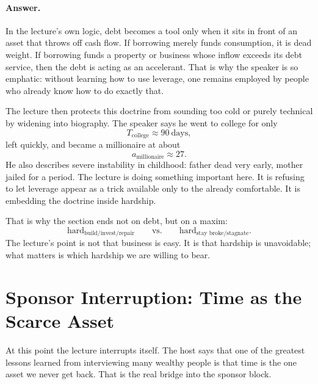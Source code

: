 \paragraph{Answer.} In the lecture's own logic, debt becomes a tool only when it sits in front of an asset that throws off cash flow. If borrowing merely funds consumption, it is dead weight. If borrowing funds a property or business whose inflow exceeds its debt service, then the debt is acting as an accelerant. That is why the speaker is so emphatic: without learning how to use leverage, one remains employed by people who already know how to do exactly that.

The lecture then protects this doctrine from sounding too cold or purely technical by widening into biography. The speaker says he went to college for only
\begin{equation}
T_{\text{college}} \approx 90\ \text{days},
\end{equation}
left quickly, and became a millionaire at about
\begin{equation}
a_{\text{millionaire}} \approx 27.
\end{equation}
He also describes severe instability in childhood: father dead very early, mother jailed for a period. The lecture is doing something important here. It is refusing to let leverage appear as a trick available only to the already comfortable. It is embedding the doctrine inside hardship.

That is why the section ends not on debt, but on a maxim:
\begin{equation}
\text{hard}_{\text{build/invest/repair}}
\qquad \text{vs.} \qquad
\text{hard}_{\text{stay broke/stagnate}}.
\end{equation}
The lecture's point is not that business is easy. It is that hardship is unavoidable; what matters is which hardship we are willing to bear.

\section{Sponsor Interruption: Time as the Scarce Asset}

At this point the lecture interrupts itself. The host says that one of the greatest lessons learned from interviewing many wealthy people is that time is the one asset we never get back. That is the real bridge into the sponsor block.

